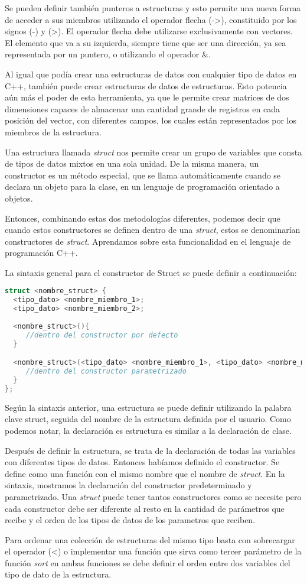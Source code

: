 Se pueden definir también punteros a estructuras y esto permite una nueva forma
de acceder a sus miembros utilizando el operador flecha (->), constituido por los signos (-) y (>). El operador flecha debe utilizarse exclusivamente con vectores. El elemento que va a
su izquierda, siempre tiene que ser una dirección, ya sea representada por un puntero, o utilizando el operador \&.

Al igual que podía crear una estructuras de datos con cualquier tipo de datos en C++, también puede crear
estructuras de datos de estructuras. Esto potencia aún más el poder de esta herramienta, ya que le
permite crear matrices de dos dimensiones capaces de almacenar una cantidad grande
de registros en cada posición del vector, con diferentes campos, los cuales están representados por los miembros de la estructura.

Una estructura llamada \emph{struct} nos permite crear un grupo de variables que consta de tipos de datos mixtos en una sola unidad. De la misma manera, un constructor es un método especial, que se llama automáticamente cuando se declara un objeto para la clase, en un lenguaje de programación orientado a objetos.

Entonces, combinando estas dos metodologías diferentes, podemos decir que cuando estos constructores se definen dentro de una \emph{struct}, estos se denominarían constructores de \emph{struct}. Aprendamos sobre esta funcionalidad en el lenguaje de programación C++.

La sintaxis general para el constructor de Struct se puede definir a continuación:

\begin{lstlisting}[language=C++]
struct <nombre_struct> {
  <tipo_dato> <nombre_miembro_1>;
  <tipo_dato> <nombre_miembro_2>;
  
  <nombre_struct>(){
     //dentro del constructor por defecto
  }

  <nombre_struct>(<tipo_dato> <nombre_miembro_1>, <tipo_dato> <nombre_miembro_2>){
     //dentro del constructor parametrizado
  }
};
\end{lstlisting}

Según la sintaxis anterior, una estructura se puede definir utilizando la palabra clave struct, seguida del nombre de la estructura definida por el usuario. Como podemos notar, la declaración es estructura es similar a la declaración de clase.

Después de definir la estructura, se trata de la declaración de todas las variables con diferentes tipos de datos. Entonces habíamos definido el constructor. Se define como una función con el mismo nombre que el nombre de \emph{struct}. En la sintaxis, mostramos la declaración del constructor predeterminado y parametrizado. Una \emph{struct} puede tener tantos constructores como se necesite pero cada constructor debe ser diferente al resto en la cantidad de parámetros que recibe y el orden de los tipos de datos de los parametros que reciben. 

Para ordenar una colección de estructuras del mismo tipo basta con sobrecargar el operador (<) o implementar una función que sirva como tercer parámetro de la función \emph{sort} en ambas funciones se debe definir el orden entre dos variables del tipo de dato de la estructura.

